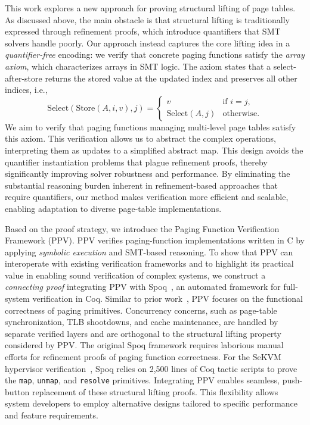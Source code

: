 This work explores a new approach for proving structural lifting of page tables. As discussed above, the main obstacle is that structural lifting is traditionally expressed through refinement proofs, which introduce quantifiers that SMT solvers handle poorly. Our approach instead captures the core lifting idea in a \emph{quantifier-free} encoding: we verify that concrete paging functions satisfy the \emph{array axiom}, which characterizes arrays in SMT logic. The axiom states that a select-after-store returns the stored value at the updated index and preserves all other indices, i.e.,
\[
\text{Select}(\text{Store}(A,i,v), j) =
\begin{cases}
v & \text{if } i = j,\\
\text{Select}(A,j) & \text{otherwise}.
\end{cases}
\]
We aim to verify that paging functions managing multi-level page tables satisfy this axiom. This verification allows us to abstract the complex operations, interpreting them as updates to a simplified abstract map. This design avoids the quantifier instantiation problems that plague refinement proofs, thereby significantly improving solver robustness and performance.
By eliminating the substantial reasoning burden inherent in refinement-based approaches that require quantifiers, our method makes verification more efficient and scalable, enabling adaptation to diverse page-table implementations.

Based on the proof strategy, we introduce the Paging Function Verification Framework (PPV).
PPV verifies paging-function implementations written in C by applying \emph{symbolic execution} and SMT-based reasoning. To show that PPV can interoperate with existing verification frameworks and to highlight its practical value in enabling sound verification of complex systems, we construct a \emph{connecting proof} integrating PPV with Spoq~\cite{spoq}, an automated framework for full-system verification in Coq. Similar to prior work~\cite{certikos,li:ieeesp2021,taososp21,li:sekvm:usenix21}, PPV focuses on the functional correctness of paging primitives. Concurrency concerns, such as page-table synchronization, TLB shootdowns, and cache maintenance, are handled by separate verified layers and are orthogonal to the structural lifting property considered by PPV. The original Spoq framework requires laborious manual efforts for refinement proofs of paging function correctness. For the SeKVM hypervisor verification~\cite{spoq-artifact}, Spoq relies on 2,500 lines of Coq tactic scripts to prove the \texttt{map}, \texttt{unmap}, and \texttt{resolve} primitives. Integrating PPV enables seamless, push-button replacement of these structural lifting proofs. This flexibility allows system developers to employ alternative designs tailored to specific performance and feature requirements.

